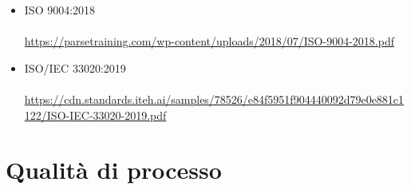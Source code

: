 \documentclass{article}
\begin{document}
{\begin{itemize}
    \url{https://coopcrea.it/wp-new/wp-content/uploads/2017/10/ISO-UNI-9001_2015-Fondamenti-e-vocabolario.pdf}
    \item ISO 9004:2018 \\ \\
    \url{https://parsetraining.com/wp-content/uploads/2018/07/ISO-9004-2018.pdf}
    \item ISO/IEC 33020:2019 \\ \\
    \url{https://cdn.standards.iteh.ai/samples/78526/e84f5951f904440092d79e0e881c1122/ISO-IEC-33020-2019.pdf}
\end{itemize}

\section{Qualità di processo}
}
\end{document}
